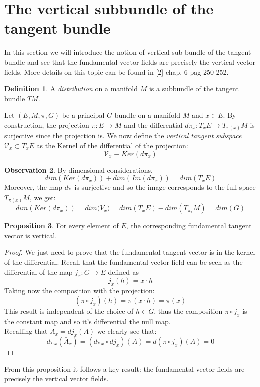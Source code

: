\documentclass[12pt,a4paper]{report}
\theoremstyle{definition}
\newtheorem{Def}{Definition}[chapter]
\theoremstyle{Theorem}
\newtheorem{Prop}[Def]{Proposition}
\theoremstyle{definition}
\theoremstyle{definition}
\newtheorem{Obs}[Def]{Observation}
\begin{document}
		\section{The vertical subbundle of the tangent bundle}
		In this section we will introduce the notion of vertical sub-bundle of the tangent bundle and see that the fundamental vector fields are precisely the vertical vector fields. More details on this topic can be found in [2] chap. 6 pag 250-252.
		\begin{Def}
			A \textit{distribution} on a manifold $M$ is a subbundle of the tangent bundle $TM$.
		\end{Def}
		Let $(E,M,\pi,G)$ be a principal $G$-bundle on a manifold $M$ and $x\in E$. By construction, the projection $\pi:E\rightarrow M$ and the differential $d\pi_{x}:T_{x}E\rightarrow T_{\pi(x)}M$ is surjective since the projection is. We now define the \textit{vertical tangent subspace} $\mathcal{V}_{x}\subset T_{x}E$ as the Kernel of the differential of the projection:
		$$\mathcal{V}_{x}\equiv Ker(d\pi_{x})$$
		\begin{Obs}
			By dimensional considerations, 
			$$dim (Ker(d\pi_{x}))+dim(Im(d\pi_{x}))=dim(T_{x}E)$$
			Moreover, the map $d\pi$ is surjective and so the image corresponds to the full space $T_{\pi(x)}M$, we get:
			$$dim (Ker(d\pi_{x}))=dim\mathcal({V}_{x})=dim(T_{x}E)-dim(T_{\pi_{x}}M)=dim (G)$$
		\end{Obs}
		\begin{Prop}\label{fund_vec_are_vert}
			For every element of $E$, the corresponding fundamental tangent vector is vertical.
		\end{Prop}
		\begin{proof}
			We just need to prove that the fundamental tangent vector is in the kernel of the differential. Recall that the fundamental vector field can be seen as the differential of the map $j_{x}:G\rightarrow E$ defined as 
			$$j_{x}(h)=x\cdot h $$
			Taking now the composition with the projection:
			$$(\pi\circ j_{x})(h)=\pi(x\cdot h)=\pi(x)$$
			This result is independent of the choice of $h\in G$, thus the composition $\pi\circ j_{x}$ is the constant map and so it's differential the null map.\\
			Recalling that $\bar{A}_{x}=dj_{x}(A)$ we clearly see that:
			$$d\pi_{x}(\bar{A}_{x})=
			(d\pi_{x}\circ dj_{x})(A)=
			d(\pi\circ j_{x})(A)=0$$
		\end{proof}
		From this proposition it follows a key result: the fundamental vector fields are precisely the vertical vector fields.
\end{document}
